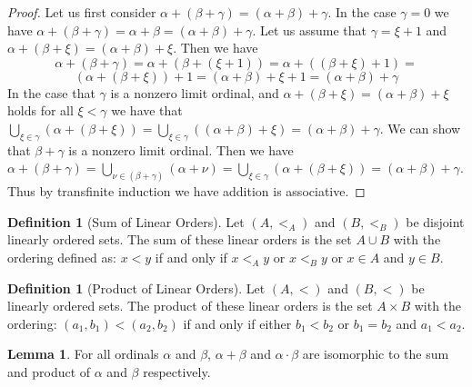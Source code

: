 \documentclass{article}
\theoremstyle{definition}
\newtheorem{defn}[thm]{Definition}
\newtheorem{lmma}[thm]{Lemma}
\begin{document}
\begin{proof}
    Let us first consider $\alpha + (\beta + \gamma) = (\alpha + \beta) + \gamma$. In the case $\gamma = 0$ we have $\alpha + (\beta + \gamma) = \alpha + \beta = (\alpha + \beta) + \gamma$. Let us assume that $\gamma = \xi + 1$ and $\alpha + (\beta + \xi) = (\alpha + \beta) + \xi$. Then we have 
    \[
        \alpha + (\beta + \gamma) = 
        \alpha + (\beta + (\xi + 1)) = \alpha + ((\beta + \xi) + 1) =
    \]
    \[
        (\alpha + (\beta + \xi)) + 1
        = 
        (\alpha + \beta) + \xi + 1
        =
        (\alpha + \beta) + \gamma
    \]
    In the case that $\gamma$ is a nonzero limit ordinal, and $\alpha + (\beta + \xi) = (\alpha + \beta) + \xi$ holds for all $\xi < \gamma$ we have that $\bigcup_{\xi \in \gamma} (\alpha + (\beta + \xi)) = \bigcup_{\xi \in \gamma} ((\alpha + \beta) + \xi) = (\alpha + \beta) + \gamma$. We can show that $\beta + \gamma$ is a nonzero limit ordinal. Then we have $\alpha + (\beta + \gamma) = \bigcup_{\nu \in (\beta + \gamma)} (\alpha + \nu) = \bigcup_{\xi \in \gamma} (\alpha + (\beta + \xi)) = (\alpha + \beta) + \gamma$. Thus by transfinite induction we have addition is associative.  
\end{proof}

\begin{defn}[Sum of Linear Orders]
    Let $(A, <_A)$ and $(B, <_B)$ be disjoint linearly ordered sets. The sum of these linear orders is the set $A \cup B$ with the ordering defined as: $x < y$ if and only if $x <_A y$ or $x <_B y$ or $x \in A$ and $y \in B$.
\end{defn}

\begin{defn}[Product of Linear Orders]
    Let $(A, <)$ and $(B, <)$ be linearly ordered sets. The product of these linear orders is the set $A \times B$ with the ordering: $(a_1, b_1) < (a_2, b_2)$ if and only if either $b_1 < b_2$ or $b_1 = b_2$ and $a_1 < a_2$.
\end{defn}

\begin{lmma}
    For all ordinals $\alpha$ and $\beta$, $\alpha + \beta$ and $\alpha \cdot \beta$ are isomorphic to the sum and product of $\alpha$ and $\beta$ respectively.
\end{lmma}
\end{document}
